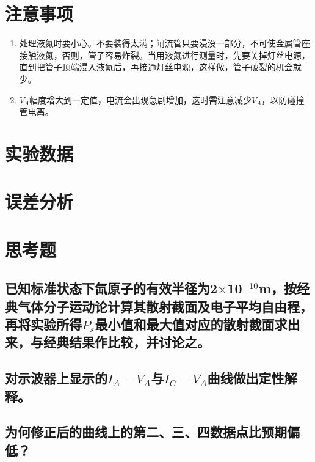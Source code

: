 \documentclass[a4paper]{article}
\begin{document}
\section{注意事项}
\begin{enumerate}
\item 处理液氮时要小心。不要装得太满；闸流管只要浸没一部分，不可使金属管座接触液氮，否则，管子容易炸裂。当用液氮进行测量时，先要关掉灯丝电源，直到把管子顶端浸入液氮后，再接通灯丝电源，这样做，管子破裂的机会就少。
\item $V_A$幅度增大到一定值，电流会出现急剧增加，这时需注意减少$V_A$，以防碰撞管电离。
\end{enumerate}

\section{实验数据}

\section{误差分析}

\section{思考题}
\subsection{已知标准状态下氙原子的有效半径为2$\times$10$^{-10}$m，按经典气体分子运动论计算其散射截面及电子平均自由程，再将实验所得$P_s$最小值和最大值对应的散射截面求出来，与经典结果作比较，并讨论之。}

\subsection{对示波器上显示的$I_A-V_A$与$I_C-V_A$曲线做出定性解释。}

\subsection{为何修正后的曲线上的第二、三、四数据点比预期偏低？}

\nocite{jiaocai}

\end{document}
